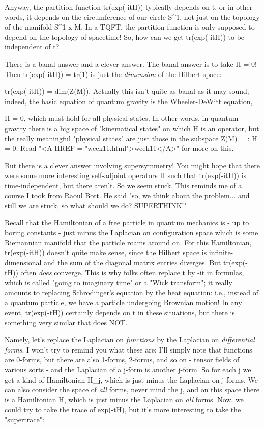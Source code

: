 Anyway, the partition function tr(exp(-itH)) typically depends
on t, or in other words, it depends on the circumference of
our circle S^{1}, not just on the topology of the manifold
S^{1} x M.  In a TQFT, the partition function is only supposed to 
depend on the topology of spacetime!  So, how can we get tr(exp(-itH))
to be independent of t?

There is a banal answer and a clever answer.  The banal
answer is to take H = 0!  Then tr(exp(-itH)) = tr(1) is
just the \emph{dimension} of the Hilbert space:

                     tr(exp(-itH)) = dim(Z(M)).
Actually this isn't quite as banal as it may sound; indeed, the basic
equation of quantum gravity is the Wheeler-DeWitt equation,

                      H \psi  = 0,
which must hold for all physical states.  In other words,
in quantum gravity there is a big space of "kinematical states"
on which H is an operator, but the really meaningful "physical
states" are just those in the subspace 
Z(M) = {\psi : H \psi  = 0}.  
Read "<A HREF = "week11.html">week11</A>" for more on this.

But there is a clever answer involving supersymmetry!
You might hope that there were some more interesting 
self-adjoint operators H such that tr(exp(-itH)) is 
time-independent, but there aren't.  So we seem stuck.
This reminds me of a course I took from Raoul Bott.  He
said "so, we think about the problem... and still we are 
stuck, so what should we do?  SUPERTHINK!"  

Recall that the Hamiltonian of a free particle in quantum mechanics 
is - up to boring constants - just minus the Laplacian on 
configuration space which is some Riemannian manifold that the
particle roams around on.  For this Hamiltonian, tr(exp(-itH)) doesn't
quite make sense, since the Hilbert space is infinite-dimensional
and the sum of the diagonal matrix entries diverges.  But 
tr(exp(-tH)) often \emph{does} converge.  This is why folks
often replace t by -it in formulas, which is called "going to 
imaginary time" or a "Wick transform"; it really amounts to
replacing Schrodinger's equation by the heat equation: i.e.,
instead of a quantum particle, we have a particle undergoing
Brownian motion!  In any event, tr(exp(-tH)) certainly depends 
on t in these situations, but there is something very similar that 
does NOT.

Namely, let's replace the Laplacian on \emph{functions} by the
Laplacian on \emph{differential forms}.  I won't try to remind
you what these are; I'll simply note that functions are 0-forms,
but there are also 1-forms, 2-forms, and so on - tensor fields
of various sorts - and the Laplacian of a j-form is another j-form.   
So for each j we get a kind of Hamiltonian H_{j}, 
which is just minus the 
Laplacian on j-forms.  We can also consider the space of \emph{all} forms,
never mind the j, and on this space there is a Hamiltonian H, which is 
just minus the Laplacian on \emph{all} forms.  Now, we could try to take 
the trace of exp(-tH), but it's more interesting to take the 
"supertrace":

